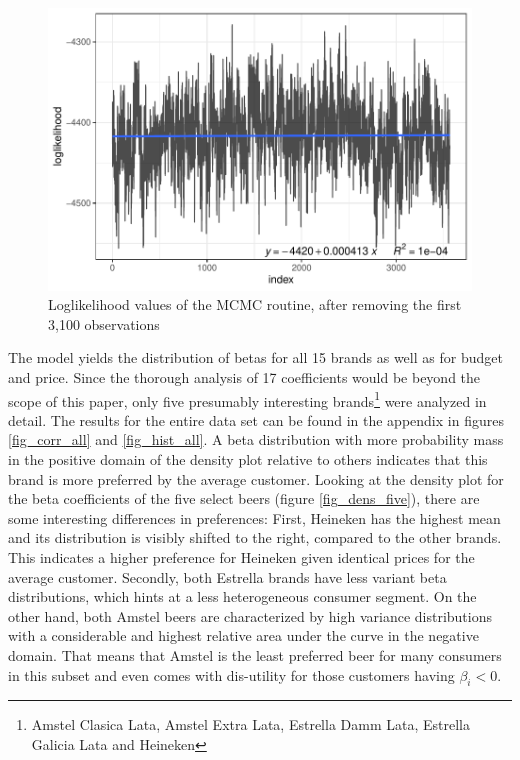 \documentclass[12pt,a4paper]{article}
\begin{document}
\begin{figure}[ht]
	\centering
  \includegraphics[scale = 0.7]{figures/mcmc_after_burnin_fitted.pdf}
	\caption{Loglikelihood values of the MCMC routine, after removing the first 3,100 observations}
	\label{fig_mcmc_burnin}
\end{figure}

The model yields the distribution of betas for all 15 brands as well as for budget and price.
Since the thorough analysis of 17 coefficients would be beyond the scope of this paper, only five presumably interesting brands\footnote{Amstel Clasica Lata, Amstel Extra Lata, Estrella Damm Lata, Estrella Galicia Lata and Heineken} were analyzed in detail.
The results for the entire data set can be found in the appendix in figures \ref{fig_corr_all} and \ref{fig_hist_all}.
A beta distribution with more probability mass in the positive domain of the density plot relative to others indicates that this brand is more preferred by the average customer.
Looking at the density plot for the beta coefficients of the five select beers (figure \ref{fig_dens_five}), there are some interesting differences in preferences:
First, Heineken has the highest mean and its distribution is visibly shifted to the right, compared to the other brands.
This indicates a higher preference for Heineken given identical prices for the average customer.
Secondly, both Estrella brands have less variant beta distributions, which hints at a less heterogeneous consumer segment.
On the other hand, both Amstel beers are characterized by high variance distributions with a considerable and highest relative area under the curve in the negative domain.
That means that Amstel is the least preferred beer for many consumers in this subset and even comes with dis-utility for those customers having $\beta_{i}<0$.
\end{document}
